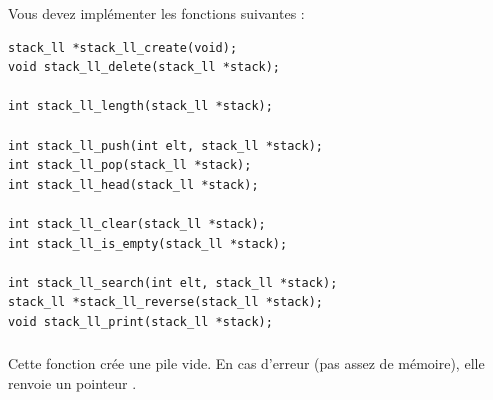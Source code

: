 \newpage


\noindent Vous devez implémenter les fonctions suivantes :

\bigskip

\lstset{language=C}
\begin{lstlisting}[frame=single,title={Liste des fonctions pour une pile avec liste chaînée}]
stack_ll *stack_ll_create(void);
void stack_ll_delete(stack_ll *stack);

int stack_ll_length(stack_ll *stack);

int stack_ll_push(int elt, stack_ll *stack);
int stack_ll_pop(stack_ll *stack);
int stack_ll_head(stack_ll *stack);

int stack_ll_clear(stack_ll *stack);
int stack_ll_is_empty(stack_ll *stack);

int stack_ll_search(int elt, stack_ll *stack);
stack_ll *stack_ll_reverse(stack_ll *stack);
void stack_ll_print(stack_ll *stack);
\end{lstlisting}


\subsubsection*{}

\noindent Cette fonction crée une pile vide.
En cas d'erreur (pas assez de mémoire), elle renvoie un pointeur .


